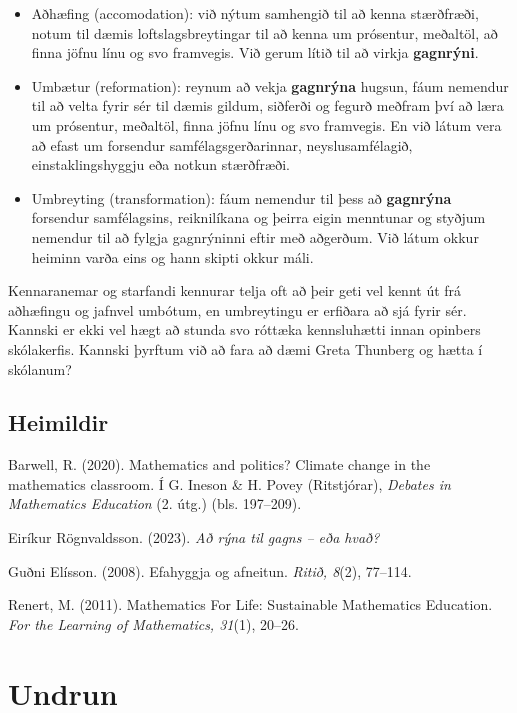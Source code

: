 \documentclass[
  icelandic,
]{book}
\providecommand{\tightlist}{%
  \setlength{\itemsep}{0pt}\setlength{\parskip}{0pt}}
\theoremstyle{definition}
\theoremstyle{definition}
\theoremstyle{definition}
\theoremstyle{definition}
\theoremstyle{remark}
\begin{document}
\begin{itemize}
\tightlist
\item
  Aðhæﬁng (accomodation): við nýtum samhengið til að kenna stærðfræði, notum til dæmis loftslagsbreytingar til að kenna um prósentur, meðaltöl, að finna jöfnu línu og svo framvegis. Við gerum lítið til að virkja \textbf{gagnrýni}.
\item
  Umbætur (reformation): reynum að vekja \textbf{gagnrýna} hugsun, fáum nemendur til að velta fyrir sér til dæmis gildum, siðferði og fegurð meðfram því að læra um prósentur, meðaltöl, finna jöfnu línu og svo framvegis. En við látum vera að efast um forsendur samfélagsgerðarinnar, neyslusamfélagið, einstaklingshyggju eða notkun stærðfræði.
\item
  Umbreyting (transformation): fáum nemendur til þess að \textbf{gagnrýna} forsendur samfélagsins, reiknilíkana og þeirra eigin menntunar og styðjum nemendur til að fylgja gagnrýninni eftir með aðgerðum. Við látum okkur heiminn varða eins og hann skipti okkur máli.
\end{itemize}

Kennaranemar og starfandi kennurar telja oft að þeir geti vel kennt út frá aðhæfingu og jafnvel umbótum, en umbreytingu er erfiðara að sjá fyrir sér. Kannski er ekki vel hægt að stunda svo róttæka kennsluhætti innan opinbers skólakerfis. Kannski þyrftum við að fara að dæmi Greta Thunberg og hætta í skólanum?

\section{Heimildir}\label{gagnryni_heimildir}

Barwell, R. (2020). Mathematics and politics? Climate change in the mathematics classroom. Í G. Ineson \& H. Povey (Ritstjórar), \emph{Debates in Mathematics Education} (2. útg.) (bls. 197--209).

Eiríkur Rögnvaldsson. (2023). \emph{Að rýna til gagns -- eða hvað?}

Guðni Elísson. (2008). Efahyggja og afneitun. \emph{Ritið, 8}(2), 77--114.

Renert, M. (2011). Mathematics For Life: Sustainable Mathematics Education. \emph{For the Learning of Mathematics, 31}(1), 20--26.

\chapter{Undrun}\label{undrun}
\end{document}
